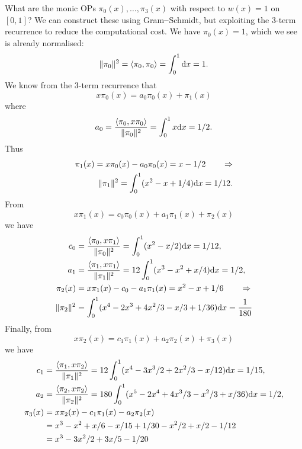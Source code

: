 \begin{example} What are the  monic OPs $\ensuremath{\pi}_0(x),\ensuremath{\ldots},\ensuremath{\pi}_3(x)$ with respect to $w(x) = 1$ on $[0,1]$? We can construct these using Gram\ensuremath{\endash}Schmidt, but exploiting the 3-term recurrence to reduce the computational cost. We have $\ensuremath{\pi}_0(x) = 1$, which we see is already normalised:
\[
\|\ensuremath{\pi}_0\|^2 = \ensuremath{\langle}\ensuremath{\pi}_0,\ensuremath{\pi}_0\ensuremath{\rangle} = \ensuremath{\int}_0^1 {\rm d} x = 1.
\]
We know from the 3-term recurrence that
\[
x \ensuremath{\pi}_0(x) = a_0 \ensuremath{\pi}_0(x) +  \ensuremath{\pi}_1(x)
\]
where
\[
a_0 = {\ensuremath{\langle}\ensuremath{\pi}_0,x \ensuremath{\pi}_0\ensuremath{\rangle}  \over \|\ensuremath{\pi}_0\|^2} = \ensuremath{\int}_0^1 x {\rm d} x = 1/2.
\]
Thus
\begin{align*}
\ensuremath{\pi}_1(x) = x \ensuremath{\pi}_0(x) - a_0 \ensuremath{\pi}_0(x) = x-1/2 \qquad  \ensuremath{\Rightarrow} \\
\|\ensuremath{\pi}_1\|^2 = \ensuremath{\int}_0^1 (x^2 - x + 1/4) {\rm d} x = 1/12.    
\end{align*}
From
\[
x \ensuremath{\pi}_1(x) = c_0 \ensuremath{\pi}_0(x) + a_1 \ensuremath{\pi}_1(x) +  \ensuremath{\pi}_2(x)
\]
we have
\begin{align*}
c_0 &= {\ensuremath{\langle}\ensuremath{\pi}_0,x \ensuremath{\pi}_1\ensuremath{\rangle}  \over \|\ensuremath{\pi}_0\|^2} = \ensuremath{\int}_0^1 (x^2 - x/2) {\rm d} x = 1/12, \\
a_1 &= {\ensuremath{\langle}\ensuremath{\pi}_1,x \ensuremath{\pi}_1\ensuremath{\rangle}  \over \|\ensuremath{\pi}_1\|^2} = 12 \ensuremath{\int}_0^1 (x^3 - x^2 + x/4) {\rm d} x = 1/2, \\
\ensuremath{\pi}_2(x) &= x \ensuremath{\pi}_1(x) - c_0 - a_1 \ensuremath{\pi}_1(x) = x^2 - x + 1/6 \qquad \ensuremath{\Rightarrow} \\
\|\ensuremath{\pi}_2\|^2 &= \int_0^1 (x^4 - 2x^3 + 4x^2/3 - x/3 + 1/36) {\rm d} x = {1 \over 180}
\end{align*}
Finally, from
\[
x \ensuremath{\pi}_2(x) = c_1 \ensuremath{\pi}_1(x) + a_2 \ensuremath{\pi}_2(x) +  \ensuremath{\pi}_3(x)
\]
we have
\begin{align*}
c_1 &= {\ensuremath{\langle}\ensuremath{\pi}_1,x \ensuremath{\pi}_2\ensuremath{\rangle}  \over \|\ensuremath{\pi}_1\|^2} = 12 \ensuremath{\int}_0^1 (x^4 - 3x^3/2 +2x^2/3 -x/12)  {\rm d} x = 1/15, \\
a_2 &= {\ensuremath{\langle}\ensuremath{\pi}_2,x \ensuremath{\pi}_2\ensuremath{\rangle}  \over \|\ensuremath{\pi}_2\|^2} = 180 \ensuremath{\int}_0^1 (x^5 - 2x^4 +4x^3/3 - x^2/3 + x/36) {\rm d} x = 1/2, \\
\ensuremath{\pi}_3(x) &= x \ensuremath{\pi}_2(x) - c_1 \ensuremath{\pi}_1(x)- a_2 \ensuremath{\pi}_2(x) \ccr 
= x^3 - x^2 + x/6 - x/15 + 1/30 -x^2/2 + x/2 - 1/12 \\
&= x^3 - 3x^2/2 + 3x/5 -1/20
\end{align*}
\end{example}

